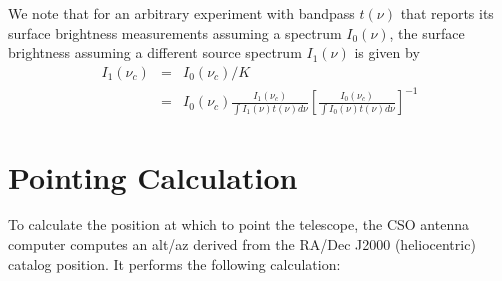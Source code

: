 \documentclass[12pt,preprint]{aastex}
\begin{document}
%
We note that for an arbitrary experiment with bandpass $t(\nu)$ that
reports its surface brightness measurements assuming a spectrum
$I_0(\nu)$, the surface brightness assuming a different source
spectrum $I_1(\nu)$ is given by
\begin{eqnarray}
I_1(\nu_c) &=& I_0(\nu_c) / K \\
\nonumber &=& I_0(\nu_c) \frac{I_1(\nu_c)}{\int I_1(\nu) t(\nu) d \nu} \left[\frac{I_0(\nu_c)}{\int I_0(\nu) t(\nu) d \nu} \right]^{-1}
\end{eqnarray}

\section{Pointing Calculation}
\label{sec:PointingCalculation}

To calculate the position at which to point the telescope, the CSO
antenna computer computes an alt/az derived from the RA/Dec J2000
(heliocentric) catalog position.  It performs the following
calculation:
\end{document}
